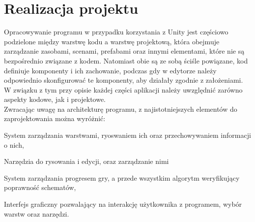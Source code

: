 \chapter{Realizacja projektu}
\label{ch:realizacja_projektu}

Opracowywanie programu w przypadku korzystania z Unity jest częściowo podzielone między warstwę kodu a warstwę projektową,
która obejmuje zarządzanie zasobami, scenami, prefabami oraz innymi elementami, które nie są bezpośrednio związane z kodem.
Natomiast obie są ze sobą ściśle powiązane, kod definiuje komponenty i ich zachowanie,
podczas gdy w edytorze należy odpowiednio skonfigurować te komponenty, aby działały zgodnie z założeniami.
W związku z tym przy opisie każdej części aplikacji należy uwzględnić zarówno aspekty kodowe, jak i projektowe.\\
\indent Zwracając uwagę na architekturę programu, z najistotniejszych elementów do zaprojektowania można wyróżnić:

\begin{citemize}
    \item System zarządzania warstwami, ryoswaniem ich oraz przechowywaniem informacji o nich,
    \item Narzędzia do rysowania i edycji, oraz zarządzanie nimi
    \item System zarządzania progresem gry, a przede wszystkim algorytm weryfikujący poprawność schematów,
    \item Interfejs graficzny pozwalający na interakcję użytkownika z programem, wybór warstw oraz narzędzi.
\end{citemize}



